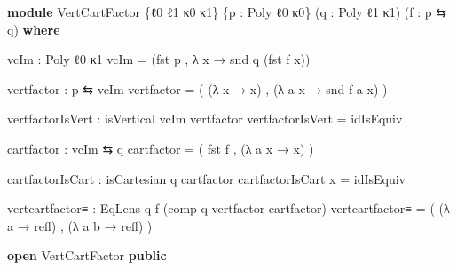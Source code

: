 \documentclass[
  11pt,
  oneside,
  article]{memoir}
\newenvironment{Shaded}{}{}
\newcommand{\KeywordTok}[1]{\textcolor[rgb]{0.00,0.44,0.13}{\textbf{#1}}}
\newcommand{\NormalTok}[1]{#1}
\newcommand{\OtherTok}[1]{\textcolor[rgb]{0.00,0.44,0.13}{#1}}
\theoremstyle{definition}
\theoremstyle{plain}
\newcommand{\0}{\textsf{0}}
\newcommand{\1}{\tn{\textsf{1}}}
\begin{document}
\begin{Shaded}
\begin{Highlighting}[]
\KeywordTok{module}\NormalTok{ VertCartFactor }\OtherTok{\{}\NormalTok{ℓ0 ℓ1 κ0 κ1}\OtherTok{\}} \OtherTok{\{}\NormalTok{p }\OtherTok{:}\NormalTok{ Poly ℓ0 κ0}\OtherTok{\}} 
                      \OtherTok{(}\NormalTok{q }\OtherTok{:}\NormalTok{ Poly ℓ1 κ1}\OtherTok{)} \OtherTok{(}\NormalTok{f }\OtherTok{:}\NormalTok{ p ⇆ q}\OtherTok{)} \KeywordTok{where}

\NormalTok{    vcIm }\OtherTok{:}\NormalTok{ Poly ℓ0 κ1}
\NormalTok{    vcIm }\OtherTok{=} \OtherTok{(}\NormalTok{fst p , }\OtherTok{λ}\NormalTok{ x }\OtherTok{→}\NormalTok{ snd q }\OtherTok{(}\NormalTok{fst f x}\OtherTok{))}

\NormalTok{    vertfactor }\OtherTok{:}\NormalTok{ p ⇆ vcIm}
\NormalTok{    vertfactor }\OtherTok{=} \OtherTok{(} \OtherTok{(λ}\NormalTok{ x }\OtherTok{→}\NormalTok{ x}\OtherTok{)}\NormalTok{ , }\OtherTok{(λ}\NormalTok{ a x }\OtherTok{→}\NormalTok{ snd f a x}\OtherTok{)} \OtherTok{)}

\NormalTok{    vertfactorIsVert }\OtherTok{:}\NormalTok{ isVertical vcIm vertfactor}
\NormalTok{    vertfactorIsVert }\OtherTok{=}\NormalTok{ idIsEquiv}

\NormalTok{    cartfactor }\OtherTok{:}\NormalTok{ vcIm ⇆ q}
\NormalTok{    cartfactor }\OtherTok{=} \OtherTok{(}\NormalTok{ fst f , }\OtherTok{(λ}\NormalTok{ a x }\OtherTok{→}\NormalTok{ x}\OtherTok{)} \OtherTok{)}

\NormalTok{    cartfactorIsCart }\OtherTok{:}\NormalTok{ isCartesian q cartfactor}
\NormalTok{    cartfactorIsCart x }\OtherTok{=}\NormalTok{ idIsEquiv}

\NormalTok{    vertcartfactor≡ }\OtherTok{:}\NormalTok{ EqLens q f }\OtherTok{(}\NormalTok{comp q vertfactor cartfactor}\OtherTok{)}
\NormalTok{    vertcartfactor≡ }\OtherTok{=} \OtherTok{(} \OtherTok{(λ}\NormalTok{ a }\OtherTok{→}\NormalTok{ refl}\OtherTok{)}\NormalTok{ , }\OtherTok{(λ}\NormalTok{ a b }\OtherTok{→}\NormalTok{ refl}\OtherTok{)} \OtherTok{)}

\KeywordTok{open}\NormalTok{ VertCartFactor }\KeywordTok{public}
\end{Highlighting}
\end{Shaded}
\end{document}
